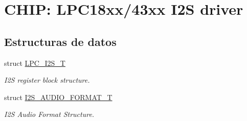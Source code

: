 \hypertarget{group___i2_s__18_x_x__43_x_x}{}\section{C\+H\+IP\+: L\+P\+C18xx/43xx I2S driver}
\label{group___i2_s__18_x_x__43_x_x}
\subsection*{Estructuras de datos}
\begin{DoxyCompactItemize}
\item 
struct \hyperlink{struct_l_p_c___i2_s___t}{L\+P\+C\+\_\+\+I2\+S\+\_\+T}
\begin{DoxyCompactList}\small\item\em I2S register block structure. \end{DoxyCompactList}\item 
struct \hyperlink{struct_i2_s___a_u_d_i_o___f_o_r_m_a_t___t}{I2\+S\+\_\+\+A\+U\+D\+I\+O\+\_\+\+F\+O\+R\+M\+A\+T\+\_\+T}
\begin{DoxyCompactList}\small\item\em I2S Audio Format Structure. \end{DoxyCompactList}\end{DoxyCompactItemize}
